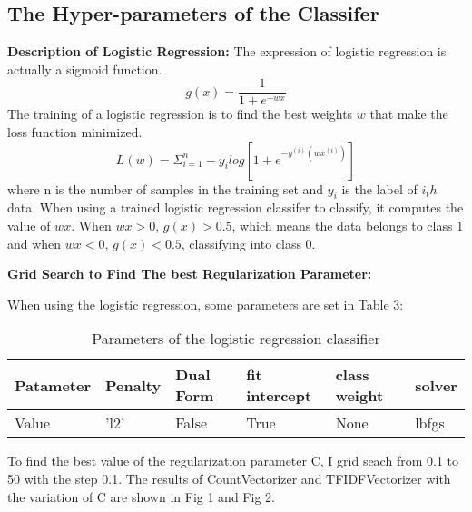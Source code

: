 \documentclass[letterpaper, 10 pt, conference]{ieeeconf}  %
\begin{document}
\subsection{The Hyper-parameters of the Classifer}
\textbf{Description of Logistic Regression:}
The expression of logistic regression is actually a sigmoid function.
$$
g(x)=\frac{1}{1+e^{-wx}}
$$
The training of a logistic regression is to find the best weights $w$ that make the loss function minimized.
$$
L(w)=\Sigma_{i=1}^n-y_ilog[1+e^{-y^{(i)}(wx^{(i)})}]
$$
where n is the number of samples in the training set and $y_i$ is the label of $i_th$ data. When using a trained logistic regression classifer to classify, it computes the value of $wx$. When $wx>0$, $g(x)>0.5$, which means the data belongs to class 1 and when $wx<0$, $g(x)<0.5$, classifying into class 0. 

\textbf{Grid Search to Find The best Regularization Parameter: }

When using the logistic regression, some parameters are set in Table 3:

\begin{table}[h]
	\caption{Parameters of the logistic regression classifier}  
	\begin{tabular*}{12cm}{llllll}  
		\hline  
		Patameter & Penalty  & Dual Form &fit intercept  &class weight &solver\\  
		\hline  
		Value  & 'l2' & False &True &None &lbfgs\\    
		\hline  
	\end{tabular*}  
\end{table}   

To find the best value of the regularization parameter C, I grid seach from 0.1 to 50 with the step 0.1. The results of CountVectorizer and TFIDFVectorizer with the variation of C are shown in Fig 1 and Fig 2.

\end{document}
